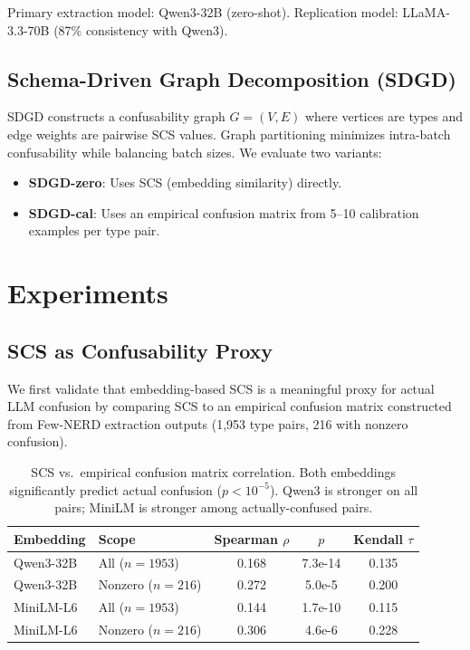 \documentclass[11pt,a4paper]{article}
\begin{document}
Primary extraction model: Qwen3-32B (zero-shot). Replication model: LLaMA-3.3-70B (87\% consistency with Qwen3).

\subsection{Schema-Driven Graph Decomposition (SDGD)}

SDGD constructs a confusability graph $G = (V, E)$ where vertices are types and edge weights are pairwise SCS values.
Graph partitioning minimizes intra-batch confusability while balancing batch sizes.
We evaluate two variants:
\begin{itemize}
\item \textbf{SDGD-zero}: Uses SCS (embedding similarity) directly.
\item \textbf{SDGD-cal}: Uses an empirical confusion matrix from 5--10 calibration examples per type pair.
\end{itemize}

\section{Experiments}

\subsection{SCS as Confusability Proxy}
\label{sec:scs-validation}

We first validate that embedding-based SCS is a meaningful proxy for actual LLM confusion by comparing SCS to an empirical confusion matrix constructed from Few-NERD extraction outputs (1,953 type pairs, 216 with nonzero confusion).

\begin{table}[t]
\centering
\small
\begin{tabular}{llccc}
\toprule
\textbf{Embedding} & \textbf{Scope} & \textbf{Spearman $\rho$} & \textbf{$p$} & \textbf{Kendall $\tau$} \\
\midrule
Qwen3-32B & All ($n{=}1953$) & 0.168 & 7.3e-14 & 0.135 \\
Qwen3-32B & Nonzero ($n{=}216$) & 0.272 & 5.0e-5 & 0.200 \\
MiniLM-L6 & All ($n{=}1953$) & 0.144 & 1.7e-10 & 0.115 \\
MiniLM-L6 & Nonzero ($n{=}216$) & 0.306 & 4.6e-6 & 0.228 \\
\bottomrule
\end{tabular}
\caption{SCS vs.\ empirical confusion matrix correlation. Both embeddings significantly predict actual confusion ($p < 10^{-5}$). Qwen3 is stronger on all pairs; MiniLM is stronger among actually-confused pairs.}
\label{tab:scs-validation}
\end{table}
\end{document}
